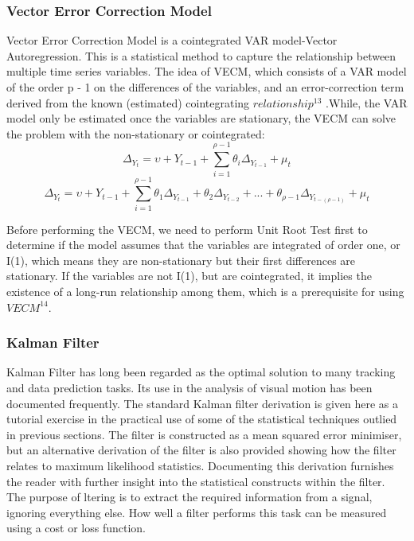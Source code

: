 \documentclass{ieeeojies}
\begin{document}
\subsubsection{\textbf{Vector Error Correction Model}}
Vector Error Correction Model is a cointegrated VAR model-Vector Autoregression. This is a statistical method to capture the relationship between multiple time series variables. The idea of VECM, which consists of a VAR model of the order p - 1 on the differences of the variables, and an error-correction term derived from the known (estimated) cointegrating $relationship^13$ .While, the VAR model only be estimated once the variables are stationary, the VECM can solve the problem with the non-stationary or cointegrated:
\begin{equation*}
    \Delta_{Y_{t}} = \upsilon + Y_{t-1}+ \sum_{i=1}^{\rho - 1} \theta_i 
\Delta_{Y_{t-1}} + \mu_t
\end{equation*}
\begin{equation}
\Delta_{Y_{t}} = \upsilon + Y_{t-1}+ \sum_{i=1}^{\rho - 1} \theta_1 \Delta_{Y_{t-1}} + \theta_2 \Delta_{Y_{t-2}} + ... + \theta_{\rho -1} \Delta_{Y_{t - {(\rho-1)}}} + \mu_t
\end{equation}

Before performing the VECM, we need to perform Unit Root Test first to determine if the model assumes that the variables are integrated of order one, or I(1), which means they are non-stationary but their first differences are stationary. If the variables are not I(1), but are cointegrated, it implies the existence of a long-run relationship among them, which is a prerequisite for using $VECM^{14}$. 

\subsubsection{\textbf{Kalman Filter}}
 Kalman Filter has long been regarded as the optimal solution to many tracking and data prediction tasks. Its use in the analysis of visual motion has been documented frequently. The standard Kalman filter derivation is given here as a tutorial exercise in the practical use of some of the statistical techniques outlied in previous sections. The filter is constructed as a mean squared error minimiser, but an alternative derivation of the filter is also provided showing how the filter relates to maximum likelihood statistics. Documenting this derivation furnishes the reader with further insight into the statistical constructs within the filter. The purpose of  ltering is to extract the required information from a signal, ignoring everything else. How well a filter performs this task can be measured using a cost or loss function.
\end{document}
